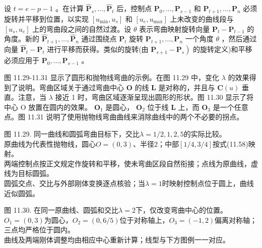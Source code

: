 \documentclass[../main.tex]{subfiles}
\begin{document}
设 \(t = e - p - 1\) 。在计算 \({\widehat{\mathbf{P}}}_{s},\ldots ,{\widehat{\mathbf{P}}}_{t}\) 后，控制点 \({\mathbf{P}}_{0},\ldots ,{\mathbf{P}}_{s - 1}\) 和 \({\mathbf{P}}_{t + 1},\ldots ,{\mathbf{P}}_{n}\) 必须旋转并平移到位置，以实现 \(\left\lbrack  {{u}_{\min },{u}_{s}}\right\rbrack\) 和 \(\left\lbrack  {{u}_{e},{u}_{\max }}\right\rbrack\) 上未改变的曲线段与 \(\left\lbrack  {{u}_{s},{u}_{e}}\right\rbrack\) 上的弯曲段之间的自然过渡。设 \(\theta\) 表示弯曲映射旋转向量 \({\mathbf{P}}_{t} - {\mathbf{P}}_{t - 1}\) 的角度。新的 \({\widehat{\mathbf{P}}}_{t + 1},\ldots ,{\widehat{\mathbf{P}}}_{n}\) 通过围绕点 \({\mathbf{P}}_{t}\) 旋转 \({\mathbf{P}}_{t + 1},\ldots ,{\mathbf{P}}_{n}\) 一个角度 \(\theta\) ，然后通过向量 \({\widehat{\mathbf{P}}}_{t} - {\mathbf{P}}_{t}\) 进行平移而获得。类似的旋转(由 \(\left. {{\mathbf{P}}_{s + 1} - {\mathbf{P}}_{s}}\right)\) 的旋转定义)和平移必须应用于 \({\mathbf{P}}_{0},\ldots ,{\mathbf{P}}_{s - 1}\) 。

图 11.29-11.31 显示了圆形和抛物线弯曲的示例。在图 11.29 中，变化 \(\lambda\) 的效果得到了说明。弯曲区域关于通过弯曲中心 \(\mathbf{O}\) 的线 \(\mathbf{L}\) 是对称的，并且与 \(\mathbf{C}\left( u\right)\) 垂直。注意，当 \(\lambda\) 接近 1 时，弯曲区域逐渐呈现出圆形的形状。图 11.30 显示了将中心 O 放置在圆内的效果。 \({\mathbf{O}}_{1}\) 是圆心， \({\mathbf{O}}_{2}\) 位于线 \(\mathbf{L}\) 上，而 \({\mathbf{O}}_{3}\) 是一个任意点。图 11.31 说明了使用抛物线弯曲曲线来消除曲线中的两个不必要的拐点。

\begin{center}
\begin{minipage}{26cm}
\centering
{}
\par\smallskip
图 11.29. 同一曲线和圆弧弯曲目标下，交比$\lambda=1/2,1,2,5$的实际比较。\\
原曲线为代表性抛物线，圆心$O=(0,3)$、半径2；中部$[1/4,3/4]$按式(11.58)映射。\\
两端控制点按正文规定作旋转和平移，使未弯曲区段自然衔接；点线为原曲线，虚线为目标圆弧。\\
圆弧交点、交比与外部刚体变换逐点核验；当$\lambda=1$时映射控制点位于圆上，曲线近似圆弧。
\end{minipage}
\end{center}

\begin{center}
\begin{minipage}{26cm}
\centering
{}
\par\smallskip
图 11.30. 在同一原曲线、圆弧和交比$\lambda=2$下，仅改变弯曲中心的位置。\\
$O_1=(0,3)$为圆心，$O_2=(0,6/5)$位于对称轴上，$O_3=(-1,2)$偏离对称轴；三点均严格位于圆内。\\
曲线及两端刚体调整均由相应中心重新计算；线型与下方图例一一对应。
\end{minipage}
\end{center}
\end{document}
